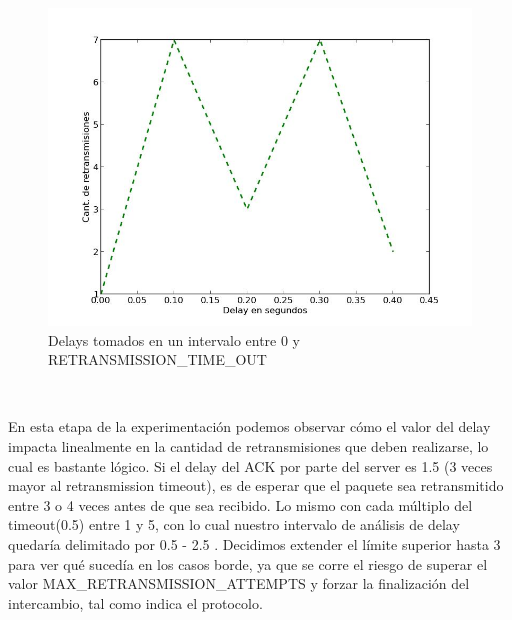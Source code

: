 \begin{figure}[H]
	\begin{center}
		  \includegraphics[scale=0.40]{../graficos/retransmissions_1.png}
		  \caption{Delays tomados en un intervalo entre 0 y RETRANSMISSION\_TIME\_OUT }
		  \label{fig:contra1}
	\end{center}
\end{figure}

~

En esta etapa de la experimentación podemos observar cómo el valor del delay impacta linealmente en la cantidad de
retransmisiones que deben realizarse, lo cual es bastante lógico. Si el delay del ACK por parte del server es 1.5 (3
veces mayor al retransmission timeout), es de esperar que el paquete sea retransmitido entre 3 o 4 veces antes de que
sea recibido. Lo mismo con cada múltiplo del timeout(0.5) entre 1 y 5, con lo cual nuestro intervalo de análisis de
delay quedaría delimitado por 0.5 - 2.5 . Decidimos extender el límite superior hasta 3 para ver qué sucedía en los
casos borde, ya que se corre el riesgo de superar el valor MAX\_RETRANSMISSION\_ATTEMPTS y forzar la finalización
del intercambio, tal como indica el protocolo.

